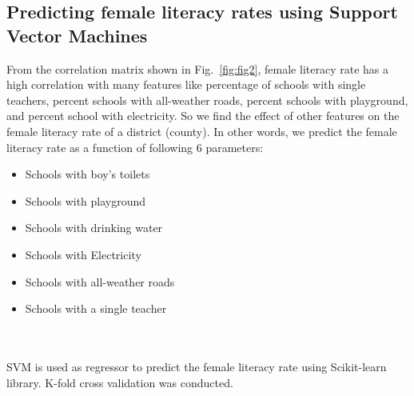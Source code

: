\documentclass{article}
\begin{document}
\subsection{Predicting female literacy rates using Support Vector Machines}
From the correlation matrix shown in Fig.~\ref{fig:fig2}, female literacy rate has a high correlation with many features like percentage of schools with single teachers, percent schools with all-weather roads, percent schools with playground, and percent school with electricity. So we find the effect of other features on the female literacy rate of a district (county). In other words, we predict the female literacy rate as a function of following 6 parameters:\\
\begin{minipage}[t]{.5\textwidth}
	\begin{itemize}
		\item Schools with boy's toilets
		\item Schools with playground
		\item Schools with drinking water
	\end{itemize}
\end{minipage}
\begin{minipage}[t]{.5\textwidth}
	\begin{itemize}
		\item Schools with Electricity
		\item Schools with all-weather roads
		\item Schools with a single teacher
	\end{itemize}
\end{minipage}\\\\
SVM is used as regressor to predict the female literacy rate using Scikit-learn library. K-fold cross validation was conducted.
\end{document}
